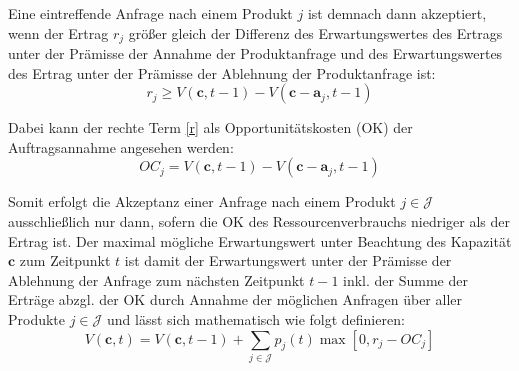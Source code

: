 Eine eintreffende Anfrage nach einem Produkt $j$ ist demnach dann akzeptiert, wenn der Ertrag $r_{j}$ größer gleich der Differenz des Erwartungswertes des Ertrags unter der Prämisse der Annahme der Produktanfrage und des Erwartungswertes des Ertrag unter der Prämisse der Ablehnung der Produktanfrage ist:
\begin{equation}\label{r}
r_{j} \ge V(\textbf{c},t-1)-V(\textbf{c}-\textbf{a}_{j},t-1)
\end{equation}

Dabei kann der rechte Term \eqref{r} als Opportunitätskosten (OK) der Auftragsannahme angesehen werden:
\begin{equation}\label{OC}
OC_{j} = V(\textbf{c},t-1)-V(\textbf{c}-\textbf{a}_{j},t-1)
\end{equation}

Somit erfolgt die Akzeptanz einer Anfrage nach einem Produkt $j\in\mathcal{J}$ ausschließlich nur dann, sofern die OK des Ressourcenverbrauchs niedriger als der Ertrag ist. Der maximal mögliche Erwartungswert unter Beachtung des Kapazität $\textbf{c}$ zum Zeitpunkt $t$ ist damit der Erwartungswert unter der Prämisse der Ablehnung der Anfrage zum nächsten Zeitpunkt $t-1$ inkl. der Summe der Erträge abzgl. der OK durch Annahme der möglichen Anfragen über aller Produkte $j\in\mathcal{J}$ und lässt sich mathematisch wie folgt definieren:
\begin{equation}\label{DPoc}
V(\textbf{c},t)=V(\textbf{c},t-1) + \sum_{j\in\mathcal{J}}p_{j}(t) \max[0,r_{j}-OC_{j}]
\end{equation}



